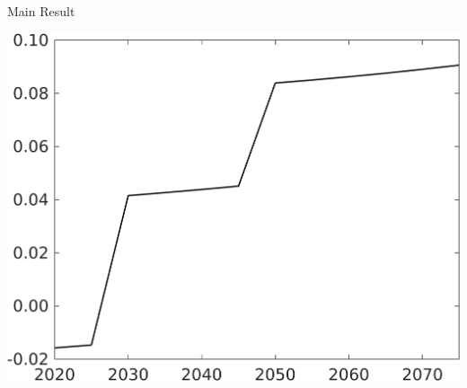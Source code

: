 \documentclass[11pt,aspectratio=169]{beamer}
\begin{document}
\begin{frame}{Main Result}
			\centering
	\begin{minipage}[]{0.32\textwidth}
\includegraphics[width=1\textwidth]{../codding_model/own_basedOnFried/optimalPol_elastS_DisuSci/figures/all_1705/Single_OPT_T_NoTaus_taul_spillover0_sep1_BN0_ineq0_red0_etaa0.79.png}
	\end{minipage}
\begin{minipage}[]{0.05\textwidth}
	\ \ \\ 
	\ \ 
\end{minipage}
	\begin{minipage}[]{0.32\textwidth}

\end{minipage}
\end{frame}
\end{document}

